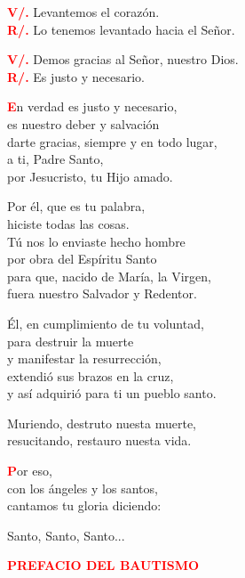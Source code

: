 \documentclass[12pt, letterpaper]{report}
\begin{document}
\noindent
\Large {\bfseries \textcolor{red}{V/.}} \hspace{0.5cm} Levantemos el coraz\'on. \\
\Large {\bfseries \textcolor{red}{R/.}} \hspace{0.5cm} Lo tenemos levantado hacia el Se\~nor. 

\noindent
\Large {\bfseries \textcolor{red}{V/.}} \hspace{0.5cm} Demos gracias al Se\~nor, nuestro Dios. \\
\Large {\bfseries \textcolor{red}{R/.}} \hspace{0.5cm} Es justo y necesario.

\newpage

\lettrine[lines=1]{\bfseries \textcolor{red}{E}}{}\Large n verdad es justo y necesario, \\ es nuestro deber y salvaci\'on \\ darte gracias, siempre y en todo lugar, \\ a ti, Padre Santo, \\ por Jesucristo, tu Hijo amado.

Por \'el, que es tu palabra, \\ hiciste todas las cosas. \\ T\'u nos lo enviaste hecho hombre \\ por obra del Esp\'iritu Santo \\ para que, nacido de Mar\'ia, la Virgen, \\ fuera nuestro Salvador y Redentor. 

\'El, en cumplimiento de tu voluntad, \\
para destruir la muerte \\
y manifestar la resurrecci\'on, \\
extendi\'o sus brazos en la cruz, \\
y as\'i adquiri\'o para ti un pueblo santo. 

Muriendo, destruto nuesta muerte, \\
resucitando, restauro nuesta vida.

\lettrine[lines=1]{\bfseries \textcolor{red}{P}}{}\Large or eso, \\
con los \'angeles y los santos, \\
cantamos tu gloria diciendo: 

Santo, Santo, Santo...

\newpage

\Large {\bfseries \textcolor{red}{PREFACIO DEL BAUTISMO}} 
\end{document}
